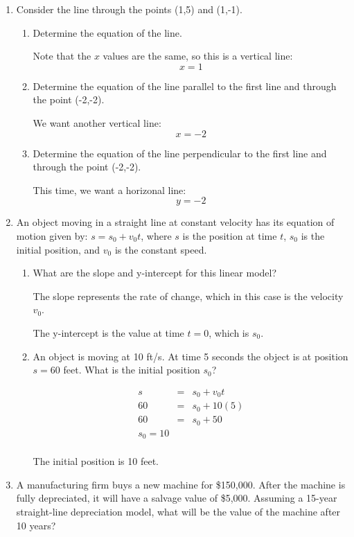 \documentclass[letterpaper,12pt,fleqn]{article}
\begin{document}
\begin{enumerate}
\item Consider the line through the points (1,5) and (1,-1).
  \begin{enumerate}
  \item Determine the equation of the line.

    Note that the $x$ values are the same, so this is a vertical line:
    \[x=1\]

  \item Determine the equation of the line parallel to the first line and
    through the point (-2,-2).

    We want another vertical line:
    \[x=-2\]
    
  \item Determine the equation of the line perpendicular to the first line
    and through the point (-2,-2).

    This time, we want a horizonal line:
    \[y=-2\]
  \end{enumerate}

\item An object moving in a straight line at constant velocity has its
  equation of motion given by: $s=s_0+v_0t$, where $s$ is the position at time
  $t$, $s_0$ is the initial position, and $v_0$ is the constant speed.
  \begin{enumerate}
  \item What are the slope and y-intercept for this linear model?

    The slope represents the rate of change, which in this case is the
    velocity $v_0$.

    The y-intercept is the value at time $t=0$, which is $s_0$.
    
  \item An object is moving at 10 ft/s. At time 5 seconds the object is
    at position $s=60$ feet. What is the initial position $s_0$?

    \begin{eqnarray*}
      s &=& s_0+v_0t \\
      60 &=& s_0+10(5) \\
      60 &=& s_0+50 \\
      s_0=10 \\
    \end{eqnarray*}

    The initial position is 10 feet.
  \end{enumerate}

\item A manufacturing firm buys a new machine for \$150,000. After the machine
  is fully depreciated, it will have a salvage value of \$5,000. Assuming a
  15-year straight-line depreciation model, what will be the value of the
  machine after 10 years?


\end{enumerate}
\end{document}
